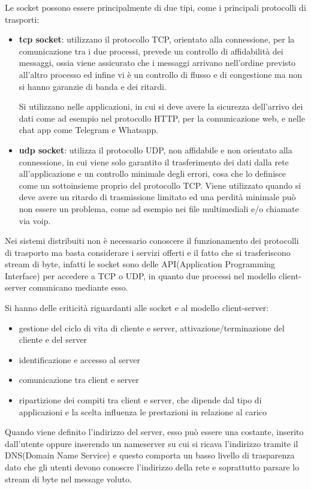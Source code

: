 \documentclass[a4paper,12pt, oneside]{book}
\begin{document}
Le socket possono essere principalmente di due tipi, come i principali protocolli di trasporti:
\begin{itemize}
    \item \textbf{tcp socket}: utilizzano il protocollo TCP, orientato alla connessione,
        per la comunicazione tra i due processi, prevede un controllo di affidabilità dei messaggi,
        ossia viene assicurato che i messaggi arrivano nell'ordine previsto all'altro processo
        ed infine vi è un controllo di flusso e di congestione ma non si hanno garanzie di banda e dei ritardi.

        Si utilizzano nelle applicazioni, in cui si deve avere la sicurezza dell'arrivo dei dati come ad
        esempio nel protocollo HTTP, per la comunicazione web, e nelle chat app come Telegram e Whatsapp.

    \item \textbf{udp socket}: utilizza il protocollo UDP, non affidabile e non orientato alla connessione,
        in cui viene solo garantito il trasferimento dei dati dalla rete all'applicazione e un controllo 
        minimale degli errori, cosa che lo definisce come un sottoinsieme proprio del protocollo TCP.\newline
        Viene utilizzato quando si deve avere un ritardo di trasmissione limitato ed una perdità minimale
        può non essere un problema, come ad esempio nei file multimediali e/o chiamate via voip.
\end{itemize}
Nei sistemi distribuiti non è necessario conoscere il funzionamento dei protocolli di trasporto ma basta
considerare i servizi offerti e il fatto che si trasferiscono stream di byte, infatti
le socket sono delle API(Application Programming Interface) per accedere a TCP o UDP, in quanto due processi
nel modello client-server comunicano mediante esso.

Si hanno delle criticità riguardanti alle socket e al modello client-server:
\begin{itemize}
    \item gestione del ciclo di vita di cliente e server, attivazione/terminazione del cliente e del server
    \item identificazione e accesso al server
    \item comunicazione tra client e server
    \item ripartizione dei compiti tra client e server, che dipende dal tipo di applicazioni 
          e la scelta influenza le prestazioni in relazione al carico
\end{itemize}
Quando viene definito l'indirizzo del server, esso può essere una costante, inserito dall'utente oppure
inserendo un nameserver su cui si ricava l'indirizzo tramite il DNS(Domain Name Service) e questo comporta 
un basso livello di trasparenza dato che gli utenti devono conoscre l'indirizzo della rete e soprattutto 
parsare lo stream di byte nel message voluto.
\end{document}
